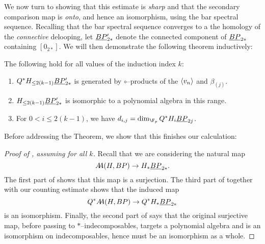 We now turn to showing that this estimate is \emph{sharp} and that the secondary comparison map is \emph{onto}, and hence an isomorphism, using the bar spectral sequence.  Recalling that the bar spectral sequence converges to a the homology of the \emph{connective} delooping, let \(\underline{\smash{BP}}_{2*}'\) denote the connected component of \(\underline{\smash{BP}}_{2*}\) containing \([0_{2*}]\).  We will then demonstrate the following theorem inductively:
\begin{theorem}\label{HFpBPCooperationsInduction}
The following hold for all values of the induction index \(k\):
\begin{enumerate}
\item \(Q^* H_{\le 2(k-1)} \underline{\smash{BP}}_{2*}'\) is generated by \(\circ\)--products of the \(\langle v_n\rangle\) and \(\beta_{(j)}\).
\item \(H_{\le 2(k-1)} \underline{\smash{BP}}_{2*}'\) is isomorphic to a polynomial algebra in this range.
\item For \(0 < i \le 2(k-1)\), we have \(d_{i,j} = \dim_{\F_p} Q^* H_i \OS{BP}{2j}\).
\end{enumerate}
\end{theorem}

\noindent Before addressing the Theorem, we show that this finishes our calculation:
\begin{proof}[{Proof of , assuming  for all \(k\)}]
Recall that we are considering the natural map \[A\!\!A(H, BP) \to H_* \underline{\smash{BP}}_{2*}.\]  The first part of  shows that this map is a surjection.  The third part of  together with our counting estimate shows that the induced map \[Q^* A\!\!A(H, BP) \to Q^* H_* \underline{\smash{BP}}_{2*}\] is an isomorphism.  Finally, the second part of  says that the original surjective map, before passing to \(\ast\)--indecomposables, targets a polynomial algebra and is an isomorphism on indecomposables, hence must be an isomorphism as a whole.
\end{proof}

